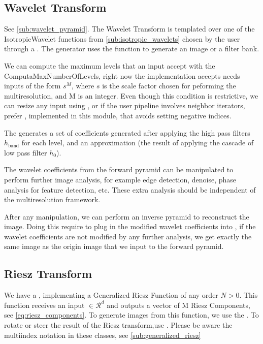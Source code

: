 \subsection{Wavelet Transform}
\label{sub:wavelet_transform_impl}

See \autoref{sub:wavelet_pyramid}. The Wavelet Transform is templated over one of the IsotropicWavelet functions from \autoref{sub:isotropic_wavelets} chosen by the user through a . The generator uses the function to generate an image or a filter bank.

We can compute the maximum levels that an input accept with the ComputaMaxNumberOfLevels, right now the implementation accepts needs inputs of the form $s^M$, where $s$ is the scale factor chosen for peforming the multiresolution, and M is an integer. Even though this condition is restrictive, we can resize any input using , or if the user pipeline involves neighbor iterators, prefer , implemented in this module, that avoids setting negative indices.

The  generates a set of coefficients generated after applying the high pass filters $h_{\text{band}}$ for each level, and an approximation (the result of applying the cascade of low pass filter $h_0$).

The wavelet coefficients from the forward pyramid can be manipulated to perform further image analysis, for example edge detection, denoise, phase analysis for feature detection, etc. These extra analysis should be independent of the multiresolution framework.

After any manipulation, we can perform an inverse pyramid to reconstruct the image. Doing this require to plug in the modified wavelet coefficients into , if the wavelet coefficients are not modified by any further analysis, we get exactly the same image as the origin image that we input to the forward pyramid.

\subsection{Riesz Transform}
\label{sub:riesz_transform_impl}

We have a , implementing a Generalized Riesz Function \cite{unser_steerable_2011} of any order $N>0$. This function receives an input $\in \mathcal{R}^d$ and outputs a vector of M Riesz Components, see \autoref{eq:riesz_components}. To generate images from this function, we use the . To rotate or steer the result of the Riesz transform,use . Please be aware the multiindex notation in these classes, see \autoref{sub:generalized_riesz}

